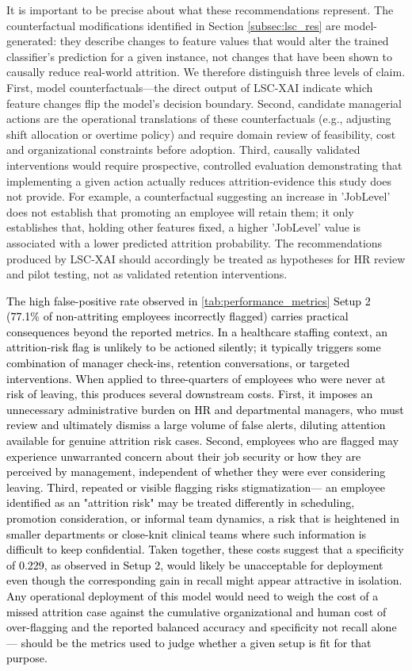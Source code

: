 \documentclass[a4paper,fleqn]{cas-sc}
\begin{document}
{It is important to be precise about what these recommendations represent. The counterfactual modifications identified in Section \ref{subsec:lsc_res} are model-generated: they describe changes to feature values that would alter the trained classifier's prediction for a given instance, not changes that have been shown to causally reduce real-world attrition. We therefore distinguish three levels of claim. First, model counterfactuals—the direct output of LSC-XAI indicate which feature changes flip the model's decision boundary. Second, candidate managerial actions are the operational translations of these counterfactuals (e.g., adjusting shift allocation or overtime policy) and require domain review of feasibility, cost and organizational constraints before adoption. Third, causally validated interventions would require prospective, controlled evaluation demonstrating that implementing a given action actually reduces attrition-evidence this study does not provide. For example, a counterfactual suggesting an increase in 'JobLevel' does not establish that promoting an employee will retain them; it only establishes that, holding other features fixed, a higher 'JobLevel' value is associated with a lower predicted attrition probability. The recommendations produced by LSC-XAI should accordingly be treated as hypotheses for HR review and pilot testing, not as validated retention interventions.

\textcolor{black}{The high false-positive rate observed in \cref{tab:performance_metrics} Setup 2 (77.1\% of non-attriting employees incorrectly flagged) carries practical consequences beyond the reported metrics. In a healthcare staffing context, an attrition-risk flag is unlikely to be actioned silently; it typically triggers some combination of manager check-ins, retention conversations, or targeted interventions. When applied to three-quarters of employees who were never at risk of leaving, this produces several downstream costs. First, it imposes an unnecessary administrative burden on HR and departmental managers, who must review and ultimately dismiss a large volume of false alerts, diluting attention available for genuine attrition risk cases. Second, employees who are flagged may experience unwarranted concern about their job security or how they are perceived by management, independent of whether they were ever considering leaving. Third, repeated or visible flagging risks stigmatization— an employee identified as an "attrition risk" may be treated differently in scheduling, promotion consideration, or informal team dynamics, a risk that is heightened in smaller departments or close-knit clinical teams where such information is difficult to keep confidential. Taken together, these costs suggest that a specificity of 0.229, as observed in Setup 2, would likely be unacceptable for deployment even though the corresponding gain in recall might appear attractive in isolation. Any operational deployment of this model would need to weigh the cost of a missed attrition case against the cumulative organizational and human cost of over-flagging and the reported balanced accuracy and specificity not recall alone — should be the metrics used to judge whether a given setup is fit for that purpose.}

}
\end{document}
